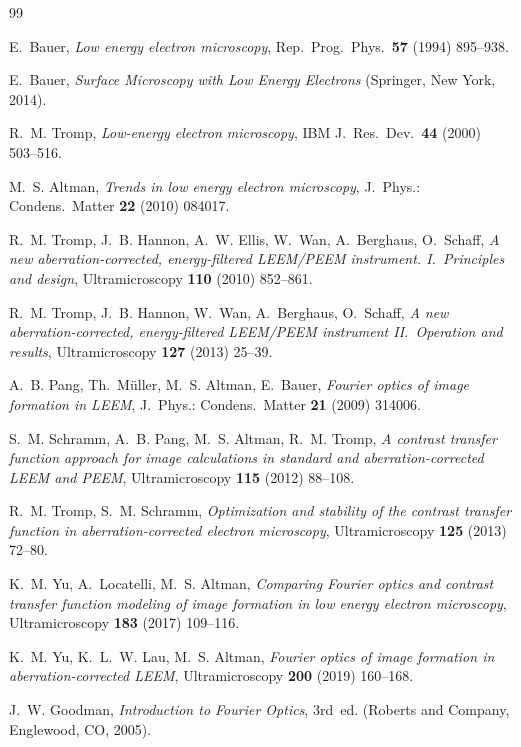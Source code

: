 \documentclass[11pt,a4paper]{article}
\theoremstyle{definition}
\theoremstyle{remark}
\begin{document}
\begin{thebibliography}{99}

E.~Bauer,
\emph{Low energy electron microscopy},
Rep.\ Prog.\ Phys.\ \textbf{57} (1994) 895--938.

E.~Bauer,
\emph{Surface Microscopy with Low Energy Electrons}
(Springer, New York, 2014).

R.~M. Tromp,
\emph{Low-energy electron microscopy},
IBM J.\ Res.\ Dev.\ \textbf{44} (2000) 503--516.

M.~S. Altman,
\emph{Trends in low energy electron microscopy},
J.\ Phys.: Condens.\ Matter \textbf{22} (2010) 084017.

R.~M. Tromp, J.~B. Hannon, A.~W. Ellis, W.~Wan, A.~Berghaus, O.~Schaff,
\emph{A new aberration-corrected, energy-filtered LEEM/PEEM instrument.
I.\ Principles and design},
Ultramicroscopy \textbf{110} (2010) 852--861.

R.~M. Tromp, J.~B. Hannon, W.~Wan, A.~Berghaus, O.~Schaff,
\emph{A new aberration-corrected, energy-filtered LEEM/PEEM instrument
II.\ Operation and results},
Ultramicroscopy \textbf{127} (2013) 25--39.

A.~B. Pang, Th.~M\"uller, M.~S. Altman, E.~Bauer,
\emph{Fourier optics of image formation in LEEM},
J.\ Phys.: Condens.\ Matter \textbf{21} (2009) 314006.

S.~M. Schramm, A.~B. Pang, M.~S. Altman, R.~M. Tromp,
\emph{A contrast transfer function approach for image calculations
in standard and aberration-corrected LEEM and PEEM},
Ultramicroscopy \textbf{115} (2012) 88--108.

R.~M. Tromp, S.~M. Schramm,
\emph{Optimization and stability of the contrast transfer function
in aberration-corrected electron microscopy},
Ultramicroscopy \textbf{125} (2013) 72--80.

K.~M. Yu, A.~Locatelli, M.~S. Altman,
\emph{Comparing Fourier optics and contrast transfer function modeling
of image formation in low energy electron microscopy},
Ultramicroscopy \textbf{183} (2017) 109--116.

K.~M. Yu, K.~L.~W. Lau, M.~S. Altman,
\emph{Fourier optics of image formation in aberration-corrected LEEM},
Ultramicroscopy \textbf{200} (2019) 160--168.

J.~W. Goodman,
\emph{Introduction to Fourier Optics}, 3rd~ed.
(Roberts and Company, Englewood, CO, 2005).


\end{thebibliography}
\end{document}
